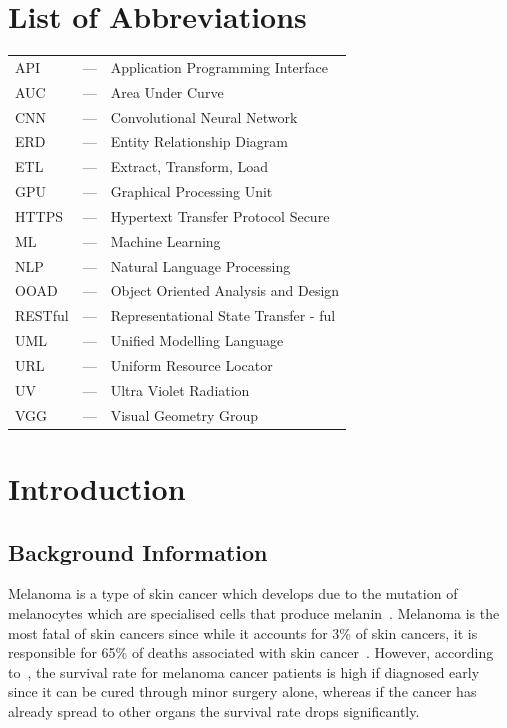 \documentclass[12pt, a4paper]{article}
\begin{document}
\section*{List of Abbreviations}
\begin{tabular}{l l l}
  API & --- & Application Programming Interface\\
  AUC & --- & Area Under Curve\\
  CNN & --- & Convolutional Neural Network\\
  ERD & --- & Entity Relationship Diagram\\
  ETL & --- & Extract, Transform, Load\\
  GPU & --- & Graphical Processing Unit\\
  HTTPS & --- & Hypertext Transfer Protocol Secure\\
  ML & --- & Machine Learning\\
  NLP & --- & Natural Language Processing\\
  OOAD & --- & Object Oriented Analysis and Design\\
  RESTful & --- & Representational State Transfer - ful\\
  UML & --- & Unified Modelling Language\\
  URL & --- & Uniform Resource Locator\\
  UV & --- & Ultra Violet Radiation\\
  VGG & --- & Visual Geometry Group
\end{tabular}

\clearpage
{}
\section{Introduction}
\subsection{Background Information}
Melanoma is a type of skin cancer which develops due to the mutation of melanocytes which are specialised cells that produce melanin~\citep{domingues2018melanoma}. Melanoma is the most fatal of skin cancers since while it accounts for 3\% of skin cancers, it is responsible for 65\% of deaths associated with skin cancer~\citep{dzwierzynski2013managing}. However, according to~\cite{davis2019current}, the survival rate for melanoma cancer patients is high if diagnosed early since it can be cured through minor surgery alone, whereas if the cancer has already spread to other organs the survival rate drops significantly.
\end{document}
